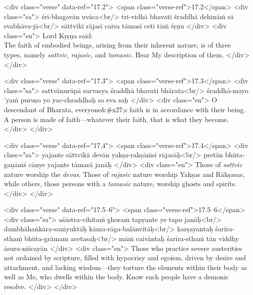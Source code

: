 \begin{html}
<div class="verse" data-ref="17.2">
  <span class="verse-ref">17.2</span>
  <div class="sa">
    śrī-bhagavān uvāca<br/>
    tri-vidhā bhavati śraddhā dehināṁ sā svabhāva-jā<br/>
    sāttvikī rājasī caiva tāmasī ceti tāṁ śṛṇu
  </div>
  <div class="en">
    Lord Kṛṣṇa said: \\ The faith of embodied beings, arising from their inherent nature, is of three types, namely \textit{sattvic}, \textit{rajasic}, and \textit{tamasic}. Hear My description of them.
  </div>
</div>
\end{html}



\begin{html}
<div class="verse" data-ref="17.3">
  <span class="verse-ref">17.3</span>
  <div class="sa">
    sattvānurūpā sarvasya śraddhā bhavati bhārata<br/>
    śraddhā-mayo ’yaṁ puruṣo yo yac-chraddhaḥ sa eva saḥ
  </div>
  <div class="en">
    O descendant of Bharata, everyone&#x27;s faith is in accordance with their being. A person is made of faith---whatever their faith, that is what they become.
  </div>
</div>
\end{html}



\begin{html}
<div class="verse" data-ref="17.4">
  <span class="verse-ref">17.4</span>
  <div class="sa">
    yajante sāttvikā devān yakṣa-rakṣāṁsi rājasāḥ<br/>
    pretān bhūta-gaṇāṁś cānye yajante tāmasā janāḥ
  </div>
  <div class="en">
    Those of \textit{sattvic} nature worship the \textit{devas}. Those of \textit{rajasic} nature worship Yakṣas and Rākṣasas, while others, those persons with a \textit{tamasic} nature, worship ghosts and spirits.
  </div>
</div>
\end{html}



\begin{html}
<div class="verse" data-ref="17.5–6">
  <span class="verse-ref">17.5–6</span>
  <div class="sa">
    aśāstra-vihitaṁ ghoraṁ tapyante ye tapo janāḥ<br/>
    dambhāhaṅkāra-saṁyuktāḥ kāma-rāga-balānvitāḥ<br/>
    karṣayantaḥ śarīra-sthaṁ bhūta-grāmam acetasaḥ<br/>
    māṁ caivāntaḥ śarīra-sthaṁ tān viddhy āsura-niścayān
  </div>
  <div class="en">
    Those who practice severe austerities not ordained by scripture, filled with hypocrisy and egoism, driven by desire and attachment, and lacking wisdom---they torture the elements within their body as well as Me, who dwells within the body. Know such people have a demonic resolve.
  </div>
</div>
\end{html}


